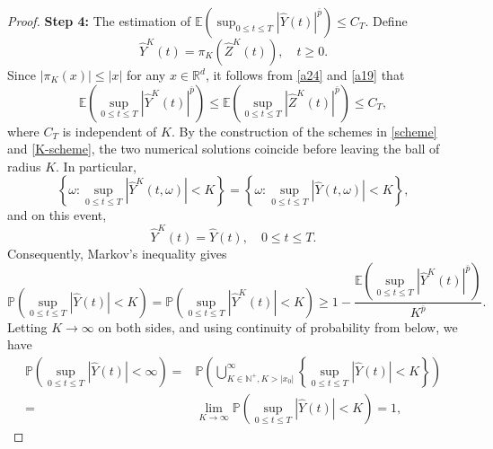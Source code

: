 \documentclass[preprint,12pt,compress]{elsarticle}
\begin{document}
\begin{proof}
\textbf{Step 4:} The estimation of $\mathbb{E}( {{{\sup }_{0 \le t \le T}}{{| {\hat Y(t)} |}^{\bar p}}} ) \le {C_T}$.
Define 
\begin{equation}  \label{a19}
	{\hat Y^K}(t) = {\pi _K}({{\hat{Z}}^K}(t)), \quad t \ge 0.
\end{equation}
Since $|\pi_K(x)| \le |x|$ for any $x \in \mathbb{R}^d$, it follows from \eqref{a24} and \eqref{a19} that
\begin{equation}  \label{a25}
	\mathbb{E}\left( {\mathop {\sup }\limits_{0 \le t \le T} {{\left| {{{\hat Y}^K}(t)} \right|}^{\bar p}}} \right) \le \mathbb{E}\left( {\mathop {\sup }\limits_{0 \le t \le T} {{\left| {{{\hat Z}^K}(t)} \right|}^{\bar p}}} \right) \le {C_T} ,
\end{equation}
where $C_T$ is independent of $K$. 
By the construction of the schemes in \eqref{scheme} and \eqref{K-scheme}, the two numerical solutions coincide before leaving the ball of radius $K$. In particular,
\begin{equation*}
	\left\{ {\omega :\mathop {\sup }\limits_{0 \le t \le T} \left| {{{\hat Y}^K}(t,\omega )} \right| < K} \right\} = \left\{ {\omega :\mathop {\sup }\limits_{0 \le t \le T} \left| {\hat Y(t,\omega )} \right| < K} \right\},
\end{equation*}
and on this event, 
\begin{equation*}
	{{\hat Y}^K}(t) = \hat Y(t), \quad  0 \le t \le T. 
\end{equation*}
Consequently, Markov's inequality gives
\begin{equation*}
	\mathbb{P}\left( {\mathop {\sup }\limits_{0 \le t \le T} {{\left| {\hat Y(t)} \right|}} < K} \right) = \mathbb{P}\left( {\mathop {\sup }\limits_{0 \le t \le T} {{\left| {{{\hat Y}^K}(t)} \right|}} < K} \right) \ge 1 - \frac{{\mathbb{E}\left( {\mathop {\sup }\limits_{0 \le t \le T} {{\left| {{{\hat Y}^K}(t)} \right|}^{\bar p}}} \right)}}{{{K^{\bar p}}}}.
\end{equation*}
Letting $K \to \infty$ on both sides, and using continuity of probability from below, we have
\begin{equation*}
\begin{split}
	\mathbb{P}\left( {\mathop {\sup }\limits_{0 \le t \le T} {{\left| {\hat Y(t)} \right|}} < \infty } \right) =& \mathbb{P}\left( {\bigcup\limits_{K \in {\mathbb{N}^ + },K > |{x_0}|}^\infty  {\left\{ {\mathop {\sup }\limits_{0 \le t \le T} {{\left| {\hat Y(t)} \right|}} < K} \right\}} } \right) \\
	=& \mathop {\lim }\limits_{K \to \infty } \mathbb{P}\left( {\mathop {\sup }\limits_{0 \le t \le T} {{\left| {\hat Y(t)} \right|}} < K} \right) = 1,

\end{split}
\end{equation*}
\end{proof}
\end{document}

